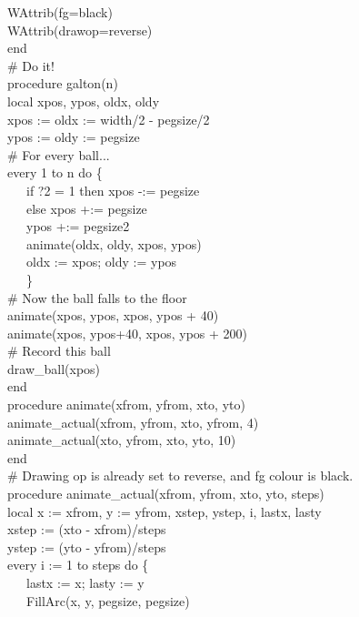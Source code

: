 {\>   WAttrib({\textquotedbl}fg=black{\textquotedbl}) \\
\>   WAttrib({\textquotedbl}drawop=reverse{\textquotedbl}) \\
end
\ \\
\# Do it! \\
procedure galton(n) \\
local xpos, ypos, oldx, oldy \\
\>   xpos := oldx := width/2 - pegsize/2 \\
\>   ypos := oldy := pegsize \\
\>   \# For every ball... \\
\>   every 1 to n do \{ \\
\>   \ \ \ if ?2 = 1 then xpos -:= pegsize \\
\>   \ \ \ else xpos +:= pegsize \\
\>   \ \ \ ypos +:= pegsize2 \\
\>   \ \ \ animate(oldx, oldy, xpos, ypos) \\
\>   \ \ \ oldx := xpos; oldy := ypos \\
\>   \ \ \ \} \\
\>   \# Now the ball falls to the floor \\
\>   animate(xpos, ypos, xpos, ypos + 40) \\
\>   animate(xpos, ypos+40, xpos, ypos + 200) \\
\>   \# Record this ball \\
\>   draw\_ball(xpos) \\
end
\ \\
procedure animate(xfrom, yfrom, xto, yto) \\
\>   animate\_actual(xfrom, yfrom, xto, yfrom, 4) \\
\>   animate\_actual(xto, yfrom, xto, yto, 10) \\
end
\ \\
\# Drawing op is already set to {\textquotedbl}reverse{\textquotedbl},
and fg colour is black. \\
procedure animate\_actual(xfrom, yfrom, xto, yto, steps) \\
local x := xfrom, y := yfrom, xstep, ystep, i, lastx, lasty \\
\>   xstep := (xto - xfrom)/steps \\
\>   ystep := (yto - yfrom)/steps \\
\>   every i := 1 to steps do \{ \\
\>   \ \ \ lastx := x; lasty := y \\
\>   \ \ \ FillArc(x, y, pegsize, pegsize) \\
}
